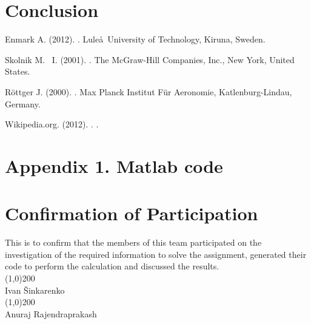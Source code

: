\documentclass{article}
\def\authorivan{Ivan \v Sinkarenko}
\def\authoranu{Anuraj Rajendraprakash}
\begin{document}
\section{Conclusion}


\begin{thebibliography}{9}

Enmark A.  (2012).
.
\newblock Lule\aa \ University of Technology, Kiruna, Sweden.

Skolnik M. ~I.  (2001).
.
\newblock The McGraw-Hill Companies, Inc., New York, United States.

R\"ottger J.  (2000).
.
\newblock Max Planck Institut F\"ur Aeronomie, Katlenburg-Lindau, Germany.

Wikipedia.org. (2012).
.
.

\end{thebibliography}


\newpage
\section{Appendix 1. Matlab code}


\newpage
\section{Confirmation of Participation}

This is to confirm that the members of this team participated on the investigation of the required information to solve the assignment, generated their code to perform the calculation and discussed the results.\\
\vspace{2cm}
\newline
\line(1,0){200}\\
\authorivan\\
\vspace{2cm}
\newline
\line(1,0){200}\\
\authoranu\\
\end{document}
